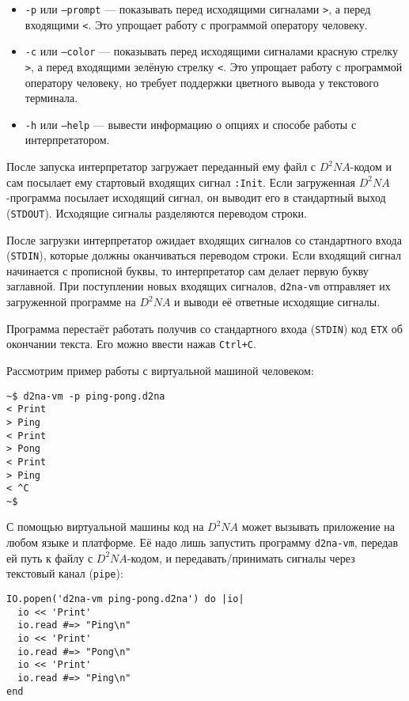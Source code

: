\documentclass[utf8,a5paper,portrait,12pt]{eskdtext}
\begin{document}
\begin{itemize}
  \item \texttt{-p} или \texttt{--prompt} — показывать перед исходящими
        сигналами \texttt{>}, а перед входящими \texttt{<}. Это упрощает работу
        с программой оператору человеку.
  \item \texttt{-c} или \texttt{--color} — показывать перед исходящими
        сигналами красную стрелку \texttt{>}, а перед входящими зелёную стрелку
        \texttt{<}. Это упрощает работу с программой оператору человеку, но
        требует поддержки цветного вывода у текстового терминала.
  \item \texttt{-h} или \texttt{--help} — вывести информацию о опциях и способе
        работы с интерпретатором.
\end{itemize}

После запуска интерпретатор загружает переданный ему файл с $D^2NA$-кодом и
сам посылает ему стартовый входящих сигнал \texttt{:Init}. Если загруженная
$D^2NA$-программа посылает исходящий сигнал, он выводит его в стандартный выход
(\texttt{STDOUT}). Исходящие сигналы разделяются переводом строки.

После загрузки интерпретатор ожидает входящих сигналов со стандартного входа
(\texttt{STDIN}), которые должны оканчиваться переводом строки.
Если входящий сигнал начинается с прописной буквы, то интерпретатор сам
делает первую букву заглавной. При поступлении новых входящих сигналов,
\texttt{d2na-vm} отправляет их загруженной программе на $D^2NA$ и выводи её
ответные исходящие сигналы.

Программа перестаёт работать получив со стандартного входа (\texttt{STDIN}) код
\texttt{ETX} об окончании текста. Его можно ввести нажав \texttt{Ctrl+C}.

Рассмотрим пример работы с виртуальной машиной человеком:
\begin{verbatim}
~$ d2na-vm -p ping-pong.d2na
< Print
> Ping
< Print
> Pong
< Print
> Ping
< ^C
~$
\end{verbatim}

С помощью виртуальной машины код на $D^2NA$ может вызывать приложение на любом
языке и платформе. Её надо лишь запустить программу \texttt{d2na-vm}, передав ей
путь к файлу с $D^2NA$-кодом, и передавать/принимать сигналы через текстовый
канал (\texttt{pipe}):

\begin{verbatim}
IO.popen('d2na-vm ping-pong.d2na') do |io|
  io << 'Print'
  io.read #=> "Ping\n"
  io << 'Print'
  io.read #=> "Pong\n"
  io << 'Print'
  io.read #=> "Ping\n"
end
\end{verbatim}
\end{document}
